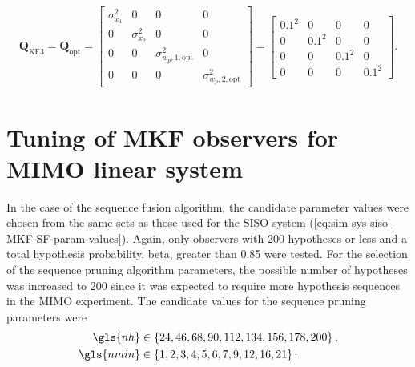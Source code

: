 \begin{equation} \label{eq:sim-sys-sim3-KF3-Q}
	\begin{aligned}
		\mathbf{Q}_{\text{KF3}}=\mathbf{Q}_{\text{opt}}=\begin{bmatrix}
			\sigma_{x_1}^2 & 0 & 0 & 0 \\
			0 & \sigma_{x_2}^2 & 0 & 0 \\
			0 & 0 & \sigma_{w_p,1,\text{opt}}^2 & 0 \\
			0 & 0 & 0 & \sigma_{w_p,2,\text{opt}}^2
		\end{bmatrix}=\begin{bmatrix}
			0.1^2 & 0 & 0 & 0 \\
			0 & 0.1^2 & 0 & 0 \\
			0 & 0 & 0.1^2 & 0 \\
			0 & 0 & 0 & 0.1^2
		\end{bmatrix}.
	\end{aligned}
\end{equation}

\section{Tuning of MKF observers for MIMO linear system} \label{sec:annex-sim-2-MKF-tuning}

 In the case of the sequence fusion algorithm, the candidate parameter values were chosen from the same sets as those used for the \gls{SISO} system (\ref{eq:sim-sys-siso-MKF-SF-param-values}). Again, only observers with 200 hypotheses or less and a total hypothesis probability, \gls{beta}, greater than 0.85 were tested. For the selection of the sequence pruning algorithm parameters, the possible number of hypotheses was increased to 200 since it was expected to require more hypothesis sequences in the \gls{MIMO} experiment. The candidate values for the sequence pruning parameters were
\begin{equation} \label{eq:sim-sys-mimo-MKF-SP-param-values}
	\begin{aligned}
		\gls{nh} &\in \left\{ 24, 46, 68, 90, 112, 134, 156, 178, 200 \right\},  \\
		\gls{nmin} &\in \left\{1, 2, 3, 4, 5, 6, 7, 9, 12, 16, 21\right\}.
	\end{aligned}
\end{equation}

